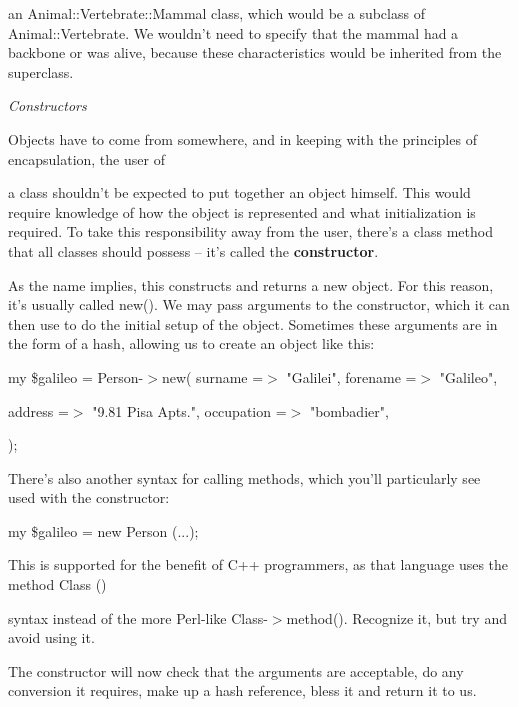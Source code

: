 \documentclass[a4paper,11pt]{book}
\begin{document}
\noindent an Animal::Vertebrate::Mammal class, which would be a subclass of Animal::Vertebrate. We wouldn't need to specify that the mammal had a backbone or was alive, because these characteristics would be inherited from the superclass.

\noindent 

\noindent \textit{Constructors}

\noindent Objects have to come from somewhere, and in keeping with the principles of encapsulation, the user of

\noindent a class shouldn't be expected to put together an object himself. This would require knowledge of how the object is represented and what initialization is required. To take this responsibility away from the user, there's a class method that all classes should possess -- it's called the \textbf{constructor}.

\noindent 

\noindent As the name implies, this constructs and returns a new object. For this reason, it's usually called new(). We may pass arguments to the constructor, which it can then use to do the initial setup of the object. Sometimes these arguments are in the form of a hash, allowing us to create an object like this:

\noindent 

\noindent my \$galileo = Person-$>$new( surname =$>$ "Galilei", forename =$>$ "Galileo",

\noindent address =$>$ "9.81 Pisa Apts.", occupation =$>$ "bombadier",

\noindent );

\noindent 

\noindent There's also another syntax for calling methods, which you'll particularly see used with the constructor:

\noindent 

\noindent my \$galileo = new Person (...);

\noindent 

\noindent This is supported for the benefit of C++ programmers, as that language uses the method Class ()

\noindent syntax instead of the more Perl-like Class-$>$method(). Recognize it, but try and avoid using it.

\noindent 

\noindent The constructor will now check that the arguments are acceptable, do any conversion it requires, make up a hash reference, bless it and return it to us.
\end{document}
